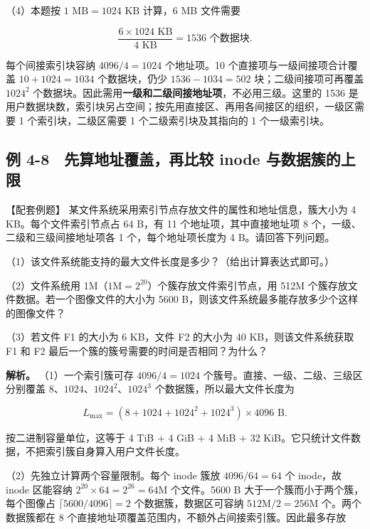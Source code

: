 （4）本题按 \(1\text{ MB}=1024\text{ KB}\) 计算，6 MB 文件需要

\[\frac{6\times1024\text{ KB}}{4\text{ KB}}=1536\text{ 个数据块}.\]

每个间接索引块容纳 \(4096/4=1024\) 个地址项。10 个直接项与一级间接项合计覆盖 \(10+1024=1034\) 个数据块，仍少 \(1536-1034=502\) 块；二级间接项可再覆盖 \(1024^2\) 个数据块。因此需用\textbf{一级和二级间接地址项}，不必用三级。这里的 1536 是用户数据块数，索引块另占空间；按先用直接区、再用各间接区的组织，一级区需要 1 个索引块，二级区需要 1 个二级索引块及其指向的 1 个一级索引块。

\subsection{例 4-8　先算地址覆盖，再比较 inode 与数据簇的上限}\label{OS04-ex6-8}

\begin{example}[配套例题]

【配套例题】 某文件系统采用索引节点存放文件的属性和地址信息，簇大小为 4 KB。每个文件索引节点占 64 B，有 11 个地址项，其中直接地址项 8 个，一级、二级和三级间接地址项各 1 个，每个地址项长度为 4 B。请回答下列问题。

（1）该文件系统能支持的最大文件长度是多少？（给出计算表达式即可。）

（2）文件系统用 1M（\(1\mathrm{M}=2^{20}\)）个簇存放文件索引节点，用 512M 个簇存放文件数据。若一个图像文件的大小为 5600 B，则该文件系统最多能存放多少个这样的图像文件？

（3）若文件 F1 的大小为 6 KB，文件 F2 的大小为 40 KB，则该文件系统获取 F1 和 F2 最后一个簇的簇号需要的时间是否相同？为什么？

\end{example}

\textbf{解析。} （1）一个索引簇可存 \(4096/4=1024\) 个簇号。直接、一级、二级、三级区分别覆盖 \(8\)、\(1024\)、\(1024^2\)、\(1024^3\) 个数据簇，所以最大文件长度为

\[L_{\max}=(8+1024+1024^2+1024^3)\times4096\text{ B}.\]

按二进制容量单位，这等于 4 TiB + 4 GiB + 4 MiB + 32 KiB。它只统计文件数据，不把索引簇自身算入用户文件长度。

（2）先独立计算两个容量限制。每个 inode 簇放 \(4096/64=64\) 个 inode，故 inode 区能容纳 \(2^{20}\times64=2^{26}=64\mathrm{M}\) 个文件。5600 B 大于一个簇而小于两个簇，每个图像占 \(\lceil5600/4096\rceil=2\) 个数据簇，数据区可容纳 \(512\mathrm{M}/2=256\mathrm{M}\) 个。两个数据簇都在 8 个直接地址项覆盖范围内，不额外占间接索引簇。因此最多存放

